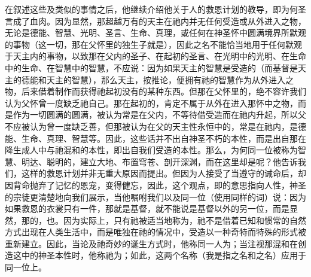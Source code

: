 在叙述这些及类似的事情之后，他继续介绍他关于人的救恩计划的教导，即为何圣言成了血肉。因为显然，那超越万有的天主在祂内并无任何受造或从外进入之物，无论是德能、智慧、光明、圣言、生命、真理，或任何在神圣怀中圆满境界所默观的事物（这一切，那在父怀里的独生子就是），因此之名不能恰当地用于任何默观于天主内的事物，以致那在父内的圣子、在起初的圣言、在光明中的光明、在生命中的生命、在智慧中的智慧，不应说：因为如果天主的智慧是受造的（而基督是天主的德能和天主的智慧），那么天主，按推论，便拥有祂的智慧作为从外进入之物，后来借着制作而获得祂起初没有的某种东西。但那在父怀里的，绝不容许我们认为父怀曾一度缺乏祂自己。那在起初的，肯定不属于从外在进入那怀中之物，而是作为一切圆满的圆满，被认为常是在父内，不等待借受造而在祂内升起，所以父不应被认为曾一度缺乏善，但那被认为在父的天主性永恒中的，常是在祂内，是德能、生命、真理、智慧等。因此，这些话并不出自神圣不朽的本性，而是出自那在降生成人中与祂混和的本性，即出自我们受造的本性。那么，为何同一位被称为智慧、明达、聪明的，建立大地、布置穹苍、剖开深渊，而在这里却是呢？他告诉我们，这样的救恩计划并非无重大原因而提出。但因为人接受了当遵守的诫命后，却因背命抛弃了记忆的恩宠，变得健忘，因此，这个观点，即的意思指向人性，神圣的宗徒更清楚地向我们展示，当他嘱咐我们以及同一位（使用同样的词）说：因为如果救恩的衣裳只有一件，那就是基督，就不能说是基督以外的另一位，而是显然，那的，也。因为实际上，只有祂被适当地称为，祂不是借着已知和惯常的自然方式出现在人类生活中，而是唯独在祂的情况中，受造以一种奇特而特殊的形式被重新建立。因此，当论及祂奇妙的诞生方式时，他称同一人为；当注视那混和在创造这中的神圣本性时，他称祂为；如此，这两个名称（我是指之名和之名）应用于同一位上。\par

